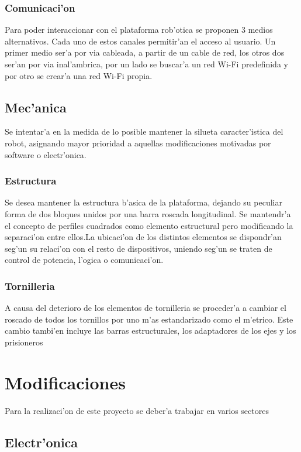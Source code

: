 \documentclass[twoside]{article}
\begin{document}
\subsubsection{Comunicaci'on}  
Para poder interaccionar con el plataforma rob'otica se proponen 3 medios alternativos. Cada uno de estos canales permitir'an el acceso al usuario. Un primer medio ser'a por via cableada, a partir de un cable de red, los otros dos ser'an por via inal'ambrica, por un lado se buscar'a un red Wi-Fi predefinida y por otro se crear'a una red Wi-Fi propia. 

\subsection{Mec'anica}
Se intentar'a en la medida de lo posible mantener la silueta caracter'istica del robot, asignando mayor prioridad a aquellas modificaciones motivadas por software o  electr'onica. 

\subsubsection{Estructura}
Se desea mantener la estructura b'asica de la plataforma, dejando su peculiar forma de dos bloques unidos por una barra roscada longitudinal. Se mantendr'a el concepto de perfiles cuadrados como elemento estructural pero modificando la separaci'on entre ellos.La ubicaci'on de los distintos elementos se dispondr'an seg'un su relaci'on con el resto de dispositivos, uniendo seg'un se traten de control de potencia, l'ogica o comunicaci'on.


\subsubsection{Tornilleria}
A causa del deterioro de los elementos de tornilleria se proceder'a a cambiar el roscado de todos los tornillos por uno m'as estandarizado como el m'etrico. Este cambio tambi'en incluye las barras estructurales, los adaptadores de los ejes y los prisioneros



\newpage
\section{Modificaciones}
Para la realizaci'on de este proyecto se deber'a trabajar en varios sectores 


\subsection{Electr'onica}
\newpage
\end{document}
